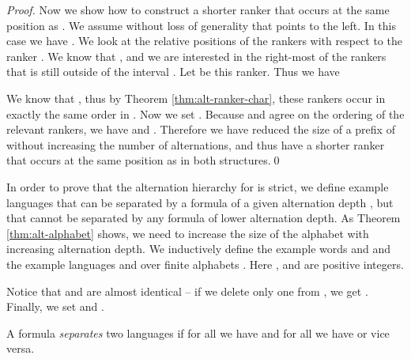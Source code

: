 \documentclass{LMCS}
\newcommand{\qedconf}{}
\renewcommand{\qedconf}{\qed}
\begin{document}
\begin{full}
\begin{proof}
  Now we show how to construct a shorter ranker  that occurs at the same
  position as . We assume
  without loss of generality that  points to the left. In this case
  we have 
  .
  We look at the
  relative positions of the rankers  with
  respect to the ranker . We know that , and we are interested in the right-most of the rankers
   that is still outside of the interval
  . Let  be this ranker.
  Thus we have
  
  We know that , thus by Theorem
  \ref{thm:alt-ranker-char}, these rankers occur in exactly the same order
  in . Now we set .
  Because  and  agree on the ordering of the relevant rankers, we have
   and . Therefore we have reduced the
  size of a prefix of  without increasing the number of alternations, and
  thus have a shorter ranker  that occurs at the same position as  in
  both structures.\qedconf
\end{proof}
\end{full}


In order to prove that the alternation hierarchy for  is strict,
we define example languages that can be separated by a formula of a
given alternation depth , but that cannot be separated by any formula of
lower alternation depth. As Theorem \ref{thm:alt-alphabet} shows,
we need to increase
the size of the alphabet with increasing alternation depth.
We inductively define the example words  and  and the
example languages  and  over finite alphabets . Here ,  and  are positive integers.

Notice that  and  are almost identical -- if we delete
only one  from , we get . Finally, we set  and .

\begin{defi}
  A formula  \emph{separates} two languages  if for all  we have  and for all
   we have  or vice versa.
\end{defi}
\end{document}
